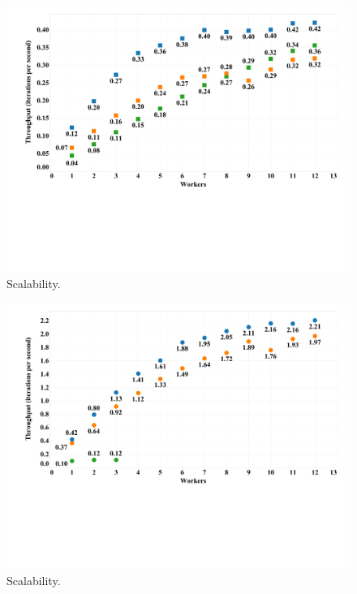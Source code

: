 \begin{figure}[h]
\centering
\includegraphics[width=5in,clip,trim=1cm 6cm 0 0]{figures/scalability_original.pdf}
\caption{Scalability.}
\label{fig:scalability_original}
\end{figure}

\begin{figure}[h]
\centering
\includegraphics[width=5in,clip,trim=1cm 6cm 0 0]{figures/scalability_reordered.pdf}
\caption{Scalability.}
\label{fig:scalability_reordered}
\end{figure}


